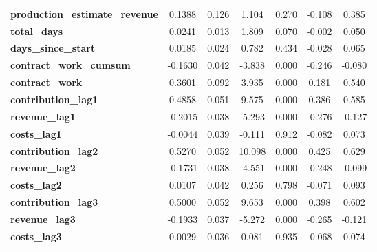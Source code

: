 \begin{center}
\begin{tabular}{lcccccc}
\textbf{production\_estimate\_revenue} &       0.1388  &        0.126     &     1.104  &         0.270        &       -0.108    &        0.385     \\
\textbf{total\_days}                   &       0.0241  &        0.013     &     1.809  &         0.070        &       -0.002    &        0.050     \\
\textbf{days\_since\_start}            &       0.0185  &        0.024     &     0.782  &         0.434        &       -0.028    &        0.065     \\
\textbf{contract\_work\_cumsum}        &      -0.1630  &        0.042     &    -3.838  &         0.000        &       -0.246    &       -0.080     \\
\textbf{contract\_work}                &       0.3601  &        0.092     &     3.935  &         0.000        &        0.181    &        0.540     \\
\textbf{contribution\_lag1}            &       0.4858  &        0.051     &     9.575  &         0.000        &        0.386    &        0.585     \\
\textbf{revenue\_lag1}                 &      -0.2015  &        0.038     &    -5.293  &         0.000        &       -0.276    &       -0.127     \\
\textbf{costs\_lag1}                   &      -0.0044  &        0.039     &    -0.111  &         0.912        &       -0.082    &        0.073     \\
\textbf{contribution\_lag2}            &       0.5270  &        0.052     &    10.098  &         0.000        &        0.425    &        0.629     \\
\textbf{revenue\_lag2}                 &      -0.1731  &        0.038     &    -4.551  &         0.000        &       -0.248    &       -0.099     \\
\textbf{costs\_lag2}                   &       0.0107  &        0.042     &     0.256  &         0.798        &       -0.071    &        0.093     \\
\textbf{contribution\_lag3}            &       0.5000  &        0.052     &     9.653  &         0.000        &        0.398    &        0.602     \\
\textbf{revenue\_lag3}                 &      -0.1933  &        0.037     &    -5.272  &         0.000        &       -0.265    &       -0.121     \\
\textbf{costs\_lag3}                   &       0.0029  &        0.036     &     0.081  &         0.935        &       -0.068    &        0.074     \\

\end{tabular}
\end{center}
